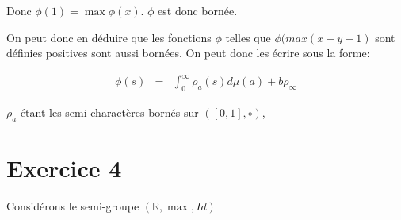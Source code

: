 \documentclass{article}
\begin{document}
Donc $\phi(1) = \max \phi(x)$. $\phi$ est donc bornée.

On peut donc en déduire que les fonctions $\phi$ telles que $\phi(max(x + y -
1)$ sont définies positives sont aussi bornées. On peut donc les écrire sous
la forme:

\begin{align*}
\phi(s) & = & \int_0^\infty \rho_a(s)d\mu(a) + b \rho_\infty
\end{align*}

$\rho_a$ étant les semi-charactères bornés sur $([0, 1], \circ)$,

\section{Exercice 4}

Considérons le semi-groupe $(\mathbb{R}, \max, Id)$
\end{document}
